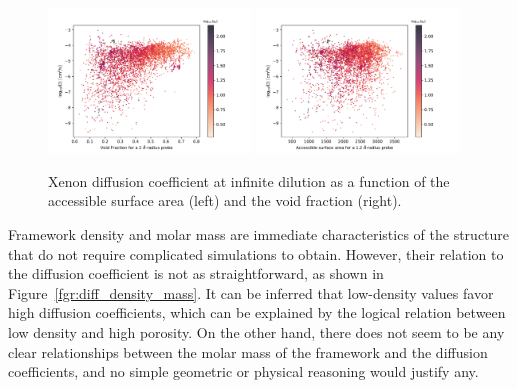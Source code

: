 \documentclass[main]{subfiles}
\begin{document}
\begin{figure}[ht]
  \centering
    \includegraphics[width=0.48\textwidth]{figures/5-diffusion/D_log-vf_2_s_+.pdf}
    \includegraphics[width=0.48\textwidth]{figures/5-diffusion/D_log-sa_12_s_+.pdf}
    \caption{Xenon diffusion coefficient at infinite dilution as a function of the accessible surface area (left) and the void fraction (right). }\label{fgr:diff_sa_vf}
\end{figure}

Framework density and molar mass are immediate characteristics of the structure that do not require complicated simulations to obtain. However, their relation to the diffusion coefficient is not as straightforward, as shown in Figure~\ref{fgr:diff_density_mass}. It can be inferred that low-density values favor high diffusion coefficients, which can be explained by the logical relation between low density and high porosity. On the other hand, there does not seem to be any clear relationships between the molar mass of the framework and the diffusion coefficients, and no simple geometric or physical reasoning would justify any.
\end{document}
